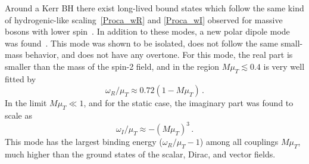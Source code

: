 \documentclass[11pt]{article}
\newcommand{\be}{\begin{equation}}
\newcommand{\ee}{\end{equation}}
\numberwithin{equation}{section} %
\begin{document}
Around a Kerr BH there exist long-lived bound states which follow the same kind of hydrogenic-like 
scaling~\eqref{Proca_wR} and \eqref{Proca_wI} observed for massive bosons with lower spin~\cite{Brito:2013wya,Brito:2020lup}. In addition to these modes, a 
new polar dipole mode was found~\cite{Brito:2013wya}. This mode was shown to be isolated, does not follow the same 
small-mass behavior, and does not have any overtone. For this mode, the real part is  smaller than the mass of the 
spin-2 field, and in the region $M\mu_T\lesssim 0.4$ is very well fitted by
%
\be
\label{polar_di_Re}
\omega_R/\mu_T\approx 0.72(1-M\mu_T)\,.
\ee
%
In the limit $M\mu_T\ll 1$, and for the static case, the imaginary part was found to scale as~\cite{Brito:2013wya}
%
\be
\omega_I/\mu_T\approx -(M\mu_T)^{3}\,.
\ee
%
This mode has the largest binding energy ($\omega_R/\mu_T-1$) among all couplings $M\mu_T$, much higher than the ground states of the 
scalar, Dirac, and vector fields. 
\end{document}
